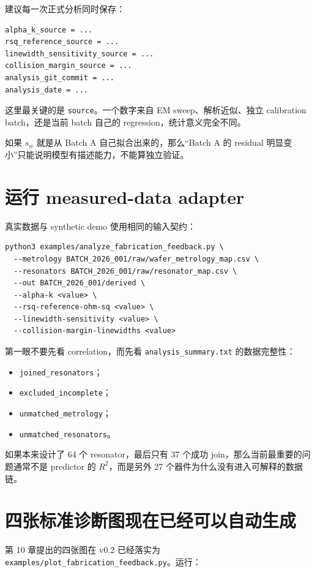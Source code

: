 建议每一次正式分析同时保存：

\begin{verbatim}
alpha_k_source = ...
rsq_reference_source = ...
linewidth_sensitivity_source = ...
collision_margin_source = ...
analysis_git_commit = ...
analysis_date = ...
\end{verbatim}

这里最关键的是 \texttt{source}。一个数字来自 EM sweep、解析近似、独立 calibration batch，还是当前 batch 自己的 regression，统计意义完全不同。

如果 $s_w$ 就是从 Batch A 自己拟合出来的，那么“Batch A 的 residual 明显变小”只能说明模型有描述能力，不能算独立验证。

\section{运行 measured-data adapter}

真实数据与 synthetic demo 使用相同的输入契约：

\begin{verbatim}
python3 examples/analyze_fabrication_feedback.py \
  --metrology BATCH_2026_001/raw/wafer_metrology_map.csv \
  --resonators BATCH_2026_001/raw/resonator_map.csv \
  --out BATCH_2026_001/derived \
  --alpha-k <value> \
  --rsq-reference-ohm-sq <value> \
  --linewidth-sensitivity <value> \
  --collision-margin-linewidths <value>
\end{verbatim}

第一眼不要先看 correlation，而先看 \texttt{analysis\_summary.txt} 的数据完整性：

\begin{itemize}
  \item \texttt{joined\_resonators}；
  \item \texttt{excluded\_incomplete}；
  \item \texttt{unmatched\_metrology}；
  \item \texttt{unmatched\_resonators}。
\end{itemize}

如果本来设计了 64 个 resonator，最后只有 37 个成功 join，那么当前最重要的问题通常不是 predictor 的 $R^2$，而是另外 27 个器件为什么没有进入可解释的数据链。

\section{四张标准诊断图现在已经可以自动生成}

第 10 章提出的四张图在 v0.2 已经落实为 \texttt{examples/plot\_fabrication\_feedback.py}。运行：


